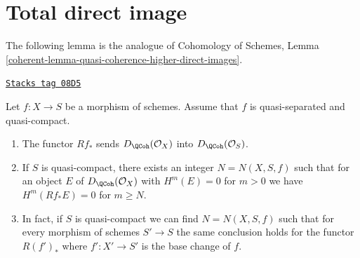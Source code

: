 \section{Total direct image}
\label{perfect-section-total-direct-image}
The following lemma is the analogue of
Cohomology of Schemes, Lemma
\ref{coherent-lemma-quasi-coherence-higher-direct-images}.

\begin{lemma}
\label{perfect-lemma-quasi-coherence-direct-image}
\href{https://stacks.math.columbia.edu/tag/08D5}{\texttt{Stacks tag 08D5}}

Let $f : X \to S$ be a morphism of schemes.
Assume that $f$ is quasi-separated and quasi-compact.
\begin{enumerate}
\item The functor $Rf_*$ sends $D_\QCoh(\mathcal{O}_X)$
into $D_\QCoh(\mathcal{O}_S)$.
\item If $S$ is quasi-compact, there exists an integer $N = N(X, S, f)$
such that for an object $E$ of $D_\QCoh(\mathcal{O}_X)$
with $H^m(E) = 0$ for $m > 0$ we have
$H^m(Rf_*E) = 0$ for $m \geq N$.
\item In fact, if $S$ is quasi-compact we can find $N = N(X, S, f)$
such that for every morphism of schemes $S' \to S$
the same conclusion holds for the functor $R(f')_*$
where $f' : X' \to S'$ is the base change of $f$.
\end{enumerate}
\end{lemma}


